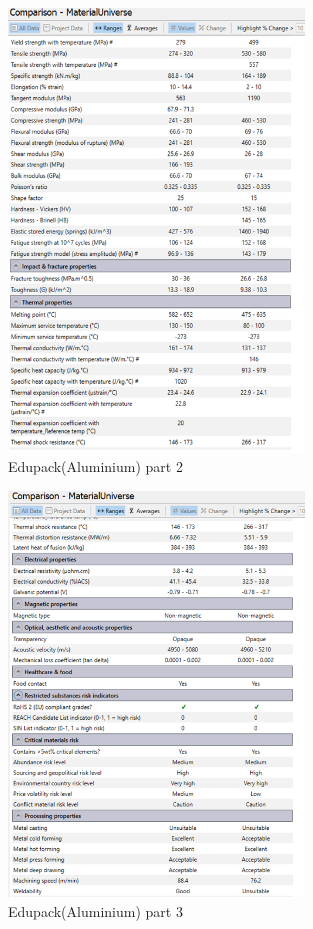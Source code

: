     \begin{figure}[htbp]
        \centering
        \includegraphics[width=0.7\textwidth]{figures/Appendix-Mats/Fig2Alu.png}
        \caption*{Edupack(Aluminium) part 2} 
        \label{fig:Alu1}
        \end{figure}

        \begin{figure}[htbp]
            \centering
            \includegraphics[width=0.7\textwidth]{figures/Appendix-Mats/Fig3Alu.png}
            \caption*{Edupack(Aluminium) part 3} 
            \label{fig:Alu2}
            \end{figure}

